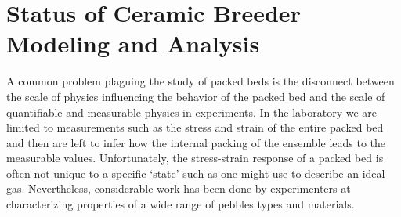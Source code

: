 \chapter{Status of Ceramic Breeder Modeling and Analysis}\label{sec:modeling-state}
A common problem plaguing the study of packed beds is the disconnect between the scale of physics influencing the behavior of the packed bed and the scale of quantifiable and measurable physics in experiments. In the laboratory we are limited to measurements such as the stress and strain of the entire packed bed and then are left to infer how the internal packing of the ensemble leads to the measurable values. Unfortunately, the stress-strain response of a packed bed is often not unique to a specific `state' such as one might use to describe an ideal gas. Nevertheless, considerable work has been done by experimenters at characterizing properties of a wide range of pebbles types and materials.





